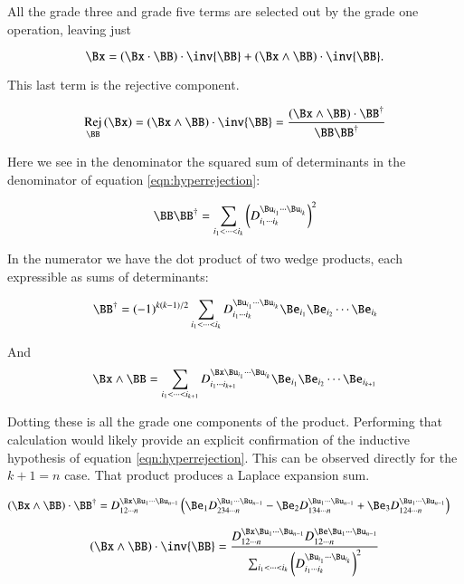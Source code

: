 \documentclass{article}      %
\DeclareMathOperator{\RejName}{Rej}
\newcommand{\Rej}[2]{\RejName_{#1}\left( {#2} \right)}
\begin{document}
All the grade three and grade five terms are selected out by the grade one operation, leaving just

\begin{equation}
\Bx = (\Bx \cdot \BB) \cdot \inv{\BB} + (\Bx \wedge \BB) \cdot \inv{\BB}.
\end{equation}

This last term is the rejective component.

\begin{equation}\label{eqn:bladerejection}
\Rej{\BB}{\Bx} = 
(\Bx \wedge \BB) \cdot \inv{\BB}
=
\frac{
(\Bx \wedge \BB) \cdot {\BB}^\dagger
}
{
\BB \BB^\dagger
}
\end{equation}

Here we see in the denominator the squared sum of determinants in the denominator of equation \ref{eqn:hyperrejection}:

\[
\BB \BB^\dagger = 
\sum_{i_1 < \cdots < i_{k} } \left(D_{i_1 \cdots i_{k}}^{\Bu_{i_1} \cdots \Bu_{i_{k}}}\right)^2
\]

In the numerator we have the dot product of two wedge products, each expressible as sums of determinants:

\[
\BB^\dagger = (-1)^{k(k-1)/2}
\sum_{i_1 < \cdots < i_{k} } 
D_{i_1 \cdots i_{k}}^{\Bu_{i_1} \cdots \Bu_{i_{k}}} \Be_{i_1} \Be_{i_2} \cdots \Be_{i_{k}}
\]

And
\[
\Bx \wedge \BB = 
\sum_{i_1 < \cdots < i_{k+1} } 
D_{i_1 \cdots i_{k+1}}^{\Bx \Bu_{i_1} \cdots \Bu_{i_{k}}} \Be_{i_1} \Be_{i_2} \cdots \Be_{i_{k+1}}
\]

Dotting these is all the grade one components of the product.  
Performing that calculation would likely provide an explicit confirmation of the inductive hypothesis of 
equation \ref{eqn:hyperrejection}.  This can be observed directly for the $k+1=n$ case.  That product produces a Laplace
expansion sum.

\begin{align*}
(\Bx \wedge \BB) \cdot \BB^\dagger
&=
D_{1 2 \cdots n}^{\Bx \Bu_{1} \cdots \Bu_{n-1}} 
\left(
\Be_{1} D_{2 3 4 \cdots n}^{\Bu_{1} \cdots \Bu_{n-1}}
-\Be_{2} D_{1 3 4 \cdots n}^{\Bu_{1} \cdots \Bu_{n-1}}
+\Be_{3} D_{1 2 4 \cdots n}^{\Bu_{1} \cdots \Bu_{n-1}}
\right)
\end{align*}

\begin{equation}\label{eqn:hyperrejectionganminus}
(\Bx \wedge \BB) \cdot \inv{\BB}
=
\frac{
D_{1 2 \cdots n}^{\Bx \Bu_{1} \cdots \Bu_{n-1}} 
D_{1 2 \cdots n}^{\Be \Bu_{1} \cdots \Bu_{n-1}}
}
{
\sum_{i_1 < \cdots < i_{k} } \left(D_{i_1 \cdots i_{k}}^{\Bu_{i_1} \cdots \Bu_{i_{k}}}\right)^2
}
\end{equation}
\end{document}
